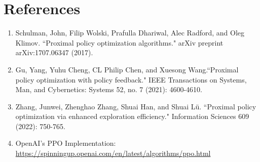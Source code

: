 \documentclass[11pt]{article}
\begin{document}
\section{References}
\begin{enumerate}
	\item Schulman, John, Filip Wolski, Prafulla Dhariwal, Alec Radford, and Oleg Klimov. ``Proximal policy optimization algorithms." arXiv preprint arXiv:1707.06347 (2017).
	\item Gu, Yang, Yuhu Cheng, CL Philip Chen, and Xuesong Wang.``Proximal policy optimization with policy feedback." IEEE Transactions on Systems, Man, and Cybernetics: Systems 52, no. 7 (2021): 4600-4610.
	
	\item Zhang, Junwei, Zhenghao Zhang, Shuai Han, and Shuai Lü. ``Proximal policy optimization via enhanced exploration efficiency." Information Sciences 609 (2022): 750-765.
	\item OpenAI’s PPO Implementation: \url{https://spinningup.openai.com/en/latest/algorithms/ppo.html}
\end{enumerate}





 
\end{document}
